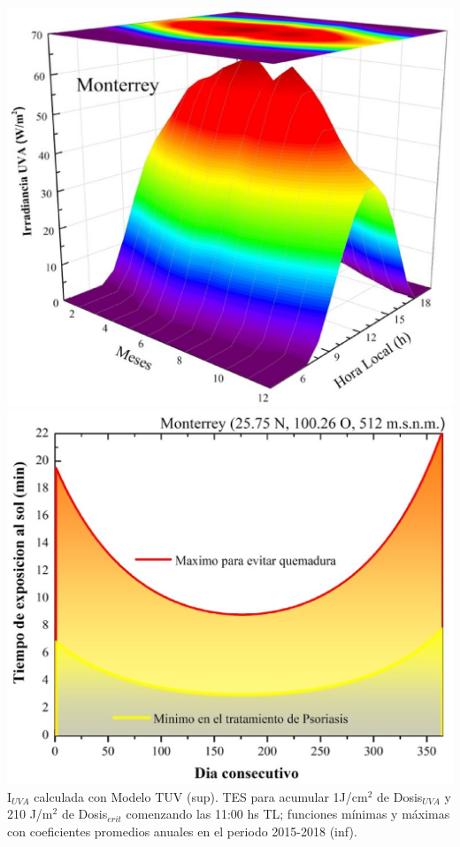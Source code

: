 \documentclass{article}
\begin{document}
\begin{multicols}{2}
\includegraphics[scale=0.39]{images/pro.eps}\\
\includegraphics[scale=0.39]{images/ecua.eps}
\changefontsizes{10pt}
\textcolor{na}{I$_{UVA}$ calculada con Modelo TUV (sup). TES para acumular 1J/cm$^2$ de Dosis$_{UVA}$ y 210 J/m$^2$ de Dosis$_{erit}$ comenzando las 11:00 hs TL; funciones mínimas y máximas con coeficientes promedios anuales en el periodo 2015-2018 (inf).}
\changefontsizes{12pt}
\begin{center}

\end{center}
\end{multicols}
\end{document}
